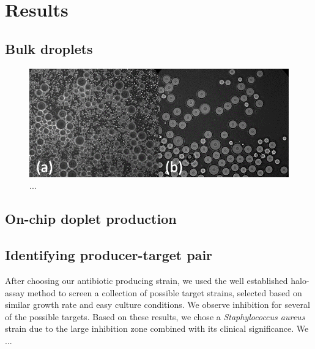 \chapter{Results}

\section{Bulk droplets}

\begin{figure}
\centering
\includegraphics[width=\linewidth]{graphics/2025_09_28_droplets_fig3.png}
\caption{...}
\label{fig:results_droplet_bulk_vs_chip}
\end{figure}

\section{On-chip doplet production}

\section{Identifying producer-target pair}
After choosing our antibiotic producing strain, we used the well established halo-assay method to screen a collection of possible target strains, selected based on similar growth rate and easy culture conditions. We observe inhibition for several of the possible targets. Based on these results, we chose a \textit{Staphylococcus aureus} strain due to the large inhibition zone combined with its clinical significance. We ...

